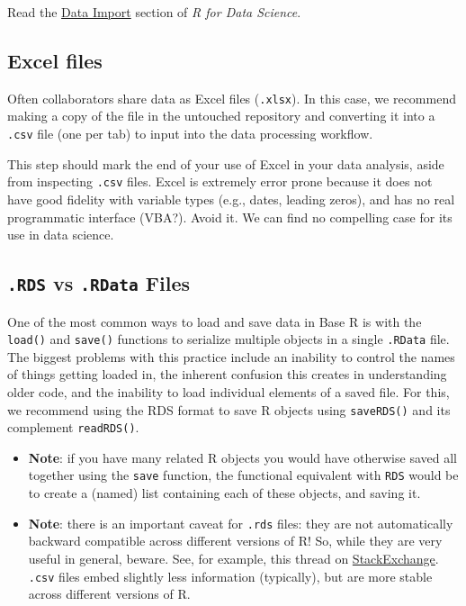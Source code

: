 \documentclass[]{book}
\begin{document}
Read the \href{https://r4ds.had.co.nz/data-import.html}{Data Import} section of \emph{R for Data Science}.

\hypertarget{excel-files}{%
\subsection{Excel files}\label{excel-files}}

Often collaborators share data as Excel files (\texttt{.xlsx}). In this case, we recommend making a copy of the file in the untouched repository and converting it into a \texttt{.csv} file (one per tab) to input into the data processing workflow.

This step should mark the end of your use of Excel in your data analysis, aside from inspecting \texttt{.csv} files. Excel is extremely error prone because it does not have good fidelity with variable types (e.g., dates, leading zeros), and has no real programmatic interface (VBA?). Avoid it. We can find no compelling case for its use in data science.

\hypertarget{rds-vs-.rdata-files}{%
\subsection{\texorpdfstring{\texttt{.RDS} vs \texttt{.RData} Files}{.RDS vs .RData Files}}\label{rds-vs-.rdata-files}}

One of the most common ways to load and save data in Base R is with the \texttt{load()} and \texttt{save()} functions to serialize multiple objects in a single \texttt{.RData} file. The biggest problems with this practice include an inability to control the names of things getting loaded in, the inherent confusion this creates in understanding older code, and the inability to load individual elements of a saved file. For this, we recommend using the RDS format to save R objects using \texttt{saveRDS()} and its complement \texttt{readRDS()}.

\begin{itemize}
\item
  \textbf{Note}: if you have many related R objects you would have otherwise saved all together using the \texttt{save} function, the functional equivalent with \texttt{RDS} would be to create a (named) list containing each of these objects, and saving it.
\item
  \textbf{Note}: there is an important caveat for \texttt{.rds} files: they are not automatically backward compatible across different versions of R! So, while they are very useful in general, beware. See, for example, this thread on \href{https://stackoverflow.com/questions/56704638/write-a-file-using-saverds-so-that-it-is-backwards-compatible-with-old-versi}{StackExchange}. \texttt{.csv} files embed slightly less information (typically), but are more stable across different versions of R.
\end{itemize}
\end{document}
